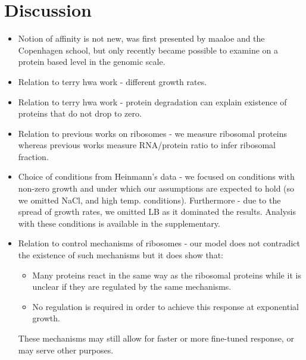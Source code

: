 \documentclass[notitlepage]{article}
\begin{document}
\section{Discussion}
\begin{itemize}
\item 
Notion of affinity is not new, was first presented by maaloe and the Copenhagen school, but only recently became possible to examine on a protein based level in the genomic scale.
\item 
Relation to terry hwa work - different growth rates.
\item 
Relation to terry hwa work - protein degradation can explain existence of proteins that do not drop to zero.
\item 
Relation to previous works on ribosomes - we measure ribosomal proteins whereas previous works measure RNA/protein ratio to infer ribosomal fraction.
\item 
Choice of conditions from Heinmann's data - we focused on conditions with non-zero growth and under which our assumptions are expected to hold (so we omitted NaCl, and high temp. conditions).
Furthermore - due to the spread of growth rates, we omitted LB as it dominated the results.
Analysis with these conditions is available in the supplementary.
\item 
Relation to control mechanisms of ribosomes - our model does not contradict the existence of such mechanisms but it does show that:
\begin{itemize}
\item 
Many proteins react in the same way as the ribosomal proteins while it is unclear if they are regulated by the same mechanisms.
\item 
No regulation is required in order to achieve this response at exponential growth.
\end{itemize}
These mechanisms may still allow for faster or more fine-tuned response, or may serve other purposes.
\end{itemize}
\end{document}
